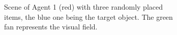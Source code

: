 \documentclass[journal]{journal}
\begin{document}
\begin{figure}%
\center
\begin{subfigure}{.47\columnwidth}
	\center
	{%
	\setlength{\fboxsep}{0pt}%
	}%
	\caption{Scene of Agent 1 (red) with three randomly placed items, the blue
	one being the target object.
	The green fan represents the visual field.}
	\label{fig:experiment:agent1}
\end{subfigure}
\begin{subfigure}{.47\columnwidth}
	\center
	{%
	\setlength{\fboxsep}{0pt}%
}
\end{subfigure}
\end{figure}
\end{document}
